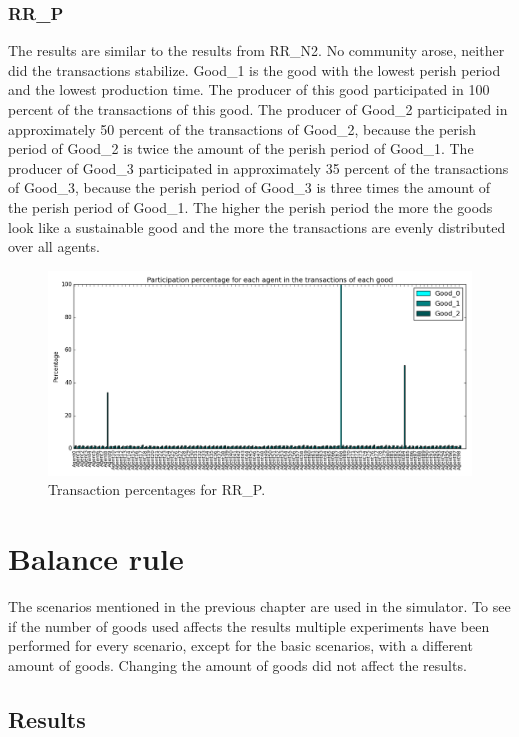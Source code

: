 \documentclass[twoside,openright]{uva-bachelor-thesis}
\begin{document}
\subsubsection{RR\_P}
The results are similar to the results from RR\_N2. No community arose, neither did the transactions stabilize. Good\_1 is the good with the lowest perish period and the lowest production time. The producer of this good participated in 100 percent of the transactions of this good. The producer of Good\_2 participated in approximately 50 percent of the transactions of Good\_2, because the perish period of Good\_2 is twice the amount of the perish period of Good\_1. The producer of Good\_3 participated in approximately 35 percent of the transactions of Good\_3, because the perish period of Good\_3 is three times the amount of the perish period of Good\_1. The higher the perish period the more the goods look like a sustainable good and the more the transactions are evenly distributed over all agents.\\
\begin{figure}[h!]
\centering
\includegraphics[scale=0.4]{Simulation_figures/RR_P/Figure1_20k}
\caption{Transaction percentages for RR\_P.}
\end{figure}


\section{Balance rule}
The scenarios mentioned in the previous chapter are used in the simulator. To see if the number of goods used affects the results multiple experiments have been performed for every scenario, except for the basic scenarios, with a different amount of goods. Changing the amount of goods did not affect the results.
\subsection{Results}
\end{document}
